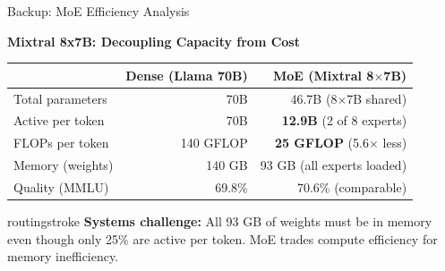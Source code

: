 \documentclass[aspectratio=169, 12pt]{beamer}
\begin{document}
\begin{frame}{Backup: MoE Efficiency Analysis}
\note{
}

\footnotesize
\textbf{Mixtral 8x7B: Decoupling Capacity from Cost}

\vspace{0.1cm}
\renewcommand{\arraystretch}{1.15}
\begin{tabular}{@{}lrr@{}}
  \toprule
  & \textbf{Dense (Llama 70B)} & \textbf{MoE (Mixtral 8$\times$7B)} \\
  \midrule
  Total parameters    & 70B         & 46.7B (8$\times$7B shared) \\
  Active per token    & 70B         & \textbf{12.9B} (2 of 8 experts) \\
  FLOPs per token     & 140 GFLOP   & \textbf{25 GFLOP} (5.6$\times$ less) \\
  Memory (weights)    & 140 GB      & 93 GB (all experts loaded) \\
  Quality (MMLU)      & 69.8\%      & 70.6\% (comparable) \\
  \bottomrule
\end{tabular}

\vspace{0.1cm}
\begin{mlsyscard}{routingstroke}
{\scriptsize\textbf{Systems challenge:} All 93 GB of weights must be in memory even though only 25\% are active per token. MoE trades compute efficiency for memory inefficiency.}
\end{mlsyscard}

\end{frame}
\end{document}
